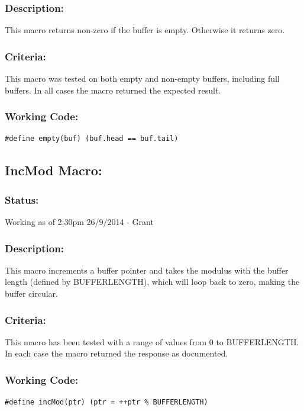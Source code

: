 \documentclass[]{report}
\begin{document}
\subsubsection{Description:}
This macro returns non-zero if the buffer is empty. Otherwise it returns zero.

\subsubsection{Criteria:}
This macro was tested on both empty and non-empty buffers, including full buffers. In all cases the macro returned the expected result.

\subsubsection{Working Code:}
\begin{lstlisting}
#define empty(buf) (buf.head == buf.tail)
\end{lstlisting}

\subsection{IncMod Macro:}
\subsubsection{Status:}
Working as of 2:30pm 26/9/2014 - Grant

\subsubsection{Description:}
This macro increments a buffer pointer and takes the modulus with the buffer length (defined by BUFFERLENGTH), which will loop back to zero, making the buffer circular.

\subsubsection{Criteria:}
This macro has been tested with a range of values from 0 to BUFFERLENGTH. In each case the macro returned the response as documented.

\subsubsection{Working Code:}
\begin{lstlisting}
#define incMod(ptr) (ptr = ++ptr % BUFFERLENGTH)
\end{lstlisting}
\end{document}

